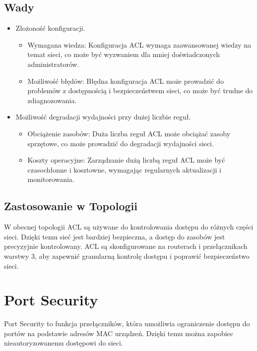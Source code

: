 \subsection{Wady}
\begin{itemize}
    \item Złożoność konfiguracji.
    \begin{itemize}
        \item Wymagana wiedza: Konfiguracja ACL wymaga zaawansowanej wiedzy na temat sieci, co może być wyzwaniem dla mniej doświadczonych administratorów.
        \item Możliwość błędów: Błędna konfiguracja ACL może prowadzić do problemów z dostępnością i bezpieczeństwem sieci, co może być trudne do zdiagnozowania.
    \end{itemize}
    \item Możliwość degradacji wydajności przy dużej liczbie reguł.
    \begin{itemize}
        \item Obciążenie zasobów: Duża liczba reguł ACL może obciążać zasoby sprzętowe, co może prowadzić do degradacji wydajności sieci.
        \item Koszty operacyjne: Zarządzanie dużą liczbą reguł ACL może być czasochłonne i kosztowne, wymagając regularnych aktualizacji i monitorowania.
    \end{itemize}
\end{itemize}

\subsection{Zastosowanie w Topologii}
W obecnej topologii ACL są używane do kontrolowania dostępu do różnych części sieci. Dzięki temu sieć jest bardziej bezpieczna, a dostęp do zasobów jest precyzyjnie kontrolowany. ACL są skonfigurowane na routerach i przełącznikach warstwy 3, aby zapewnić granularną kontrolę dostępu i poprawić bezpieczeństwo sieci.

\section{Port Security}

Port Security to funkcja przełączników, która umożliwia ograniczenie dostępu do portów na podstawie adresów MAC urządzeń. Dzięki temu można zapobiec nieautoryzowanemu dostępowi do sieci.

